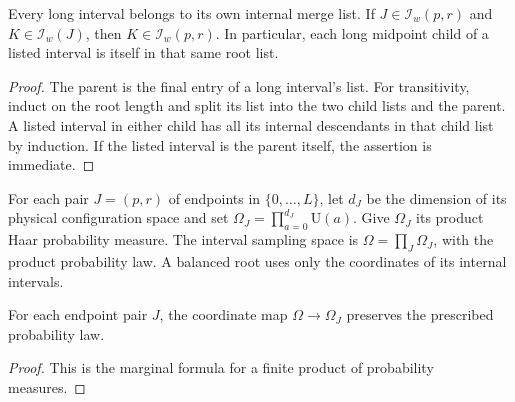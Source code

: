 \begin{lemma}
    \label{lem:balanced_interval_merge_closure}
    \leanok
    Every long interval belongs to its own internal merge list.
    If $J\in\mathcal I_w(p,r)$ and $K\in\mathcal I_w(J)$, then
    $K\in\mathcal I_w(p,r)$. In particular, each long midpoint child
    of a listed interval is itself in that same root list.
\end{lemma}
\begin{proof}\leanok
    The parent is the final entry of a long interval's list.
    For transitivity, induct on the root length and split its list into
    the two child lists and the parent. A listed interval in either
    child has all its internal descendants in that child list by
    induction. If the listed interval is the parent itself, the
    assertion is immediate.
\end{proof}

\begin{definition}
    \label{def:interval_sampling_choices}
    \leanok
    For each pair $J=(p,r)$ of endpoints in $\{0,\ldots,L\}$, let $d_J$
    be the dimension of its physical configuration space and set
    $\Omega_J=\prod_{a=0}^{d_J}\mathrm U(a)$. Give $\Omega_J$ its product
    Haar probability measure. The interval sampling space is
    $\Omega=\prod_J\Omega_J$, with the product probability law.
    A balanced root uses only the coordinates of its internal intervals.
\end{definition}

\begin{lemma}
    \label{lem:interval_sampling_marginal}
    \leanok
    For each endpoint pair $J$, the coordinate map
    $\Omega\to\Omega_J$ preserves the prescribed probability law.
\end{lemma}
\begin{proof}\leanok
    This is the marginal formula for a finite product of probability
    measures.
\end{proof}

